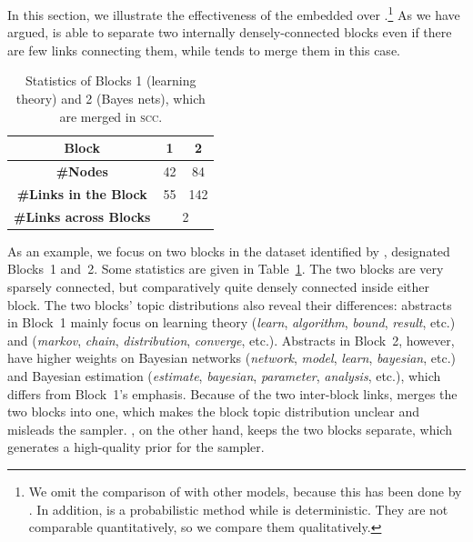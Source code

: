 In this section, we illustrate the effectiveness of the embedded \wsbm over
\scc.\footnote{We omit the comparison of \wsbm with other models, because this
  has been done by . In addition, \wsbm is a
  probabilistic method while \scc is deterministic. They are not comparable
  quantitatively, so we compare them qualitatively.}  As we have argued, \wsbm
is able to separate two internally densely-connected blocks even if there are
few links connecting them, while \scc tends to merge them in this case.
\begin{table}[t!]
  \centering
  \small
  \begin{tabular}{|c|c|c|}
    \hline
    \bf Block & 1 & 2\\ \hline
    \bf \#Nodes & 42 & 84\\ \hline
    \bf \#Links in the Block & 55 & 142\\ \hline
    \bf \#Links across Blocks & \multicolumn{2}{c|}{2} \\ \hline
  \end{tabular}
  \caption{Statistics of Blocks 1 (learning theory) and 2 (Bayes nets), which are
    merged in \textsc{scc}.}\label{tab:block}
\end{table}
As an example, we focus on two blocks in the \cora dataset identified by \wsbm, designated
Blocks~1 and~2.  Some statistics are given in Table~\ref{tab:block}.
The two blocks are very sparsely connected, but comparatively quite
densely connected inside either block.  The two blocks' topic
distributions also reveal their differences: abstracts in Block~1
mainly focus on learning theory (\emph{learn}, \emph{algorithm},
\emph{bound}, \emph{result}, etc.) and \mcmc (\emph{markov},
\emph{chain}, \emph{distribution}, \emph{converge}, etc.).  Abstracts
in Block~2, however, have higher weights on Bayesian networks
(\emph{network}, \emph{model}, \emph{learn}, \emph{bayesian}, etc.)
and Bayesian estimation (\emph{estimate}, \emph{bayesian},
\emph{parameter}, \emph{analysis}, etc.), which differs from Block~1's
emphasis.  Because of the two inter-block links, \scc
merges the two blocks into one, which makes the block topic
distribution unclear and misleads the sampler.  \wsbm, on the other
hand, keeps the two blocks separate, which generates a high-quality
prior for the sampler.